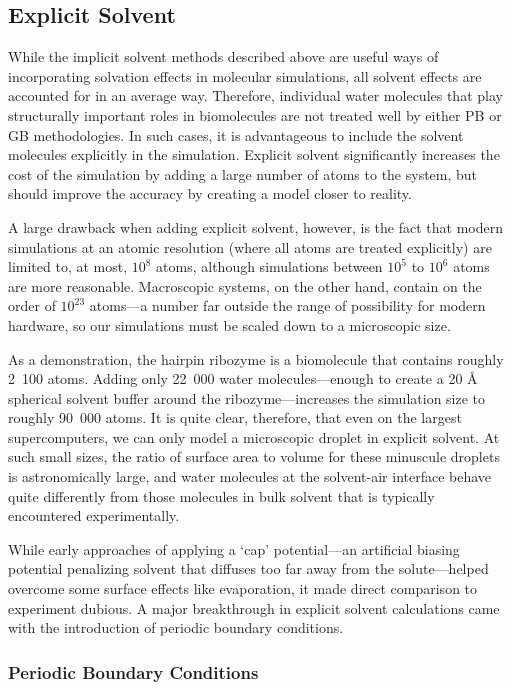 \subsection{Explicit Solvent}

While the implicit solvent methods described above are useful ways of
incorporating solvation effects in molecular simulations, all solvent effects
are accounted for in an average way. Therefore, individual water molecules that
play structurally important roles in biomolecules are not treated well by either
PB or GB methodologies. In such cases, it is advantageous to include the solvent
molecules explicitly in the simulation. Explicit solvent significantly increases
the cost of the simulation by adding a large number of atoms to the system, but
should improve the accuracy by creating a model closer to reality.

A large drawback when adding explicit solvent, however, is the fact that modern
simulations at an atomic resolution (\ie where all atoms are treated explicitly)
are limited to, at most, $10^8$ atoms, \cite{100M_Stupid} although simulations
between $10^5$ to $10^6$ atoms are more reasonable. Macroscopic systems, on the
other hand, contain on the order of $10^{23}$ atoms---a number far outside the
range of possibility for modern hardware, so our simulations must be scaled down
to a microscopic size.

As a demonstration, the hairpin ribozyme is a biomolecule that contains roughly
\mbox{2 100} atoms. Adding only \mbox{22 000} water molecules---enough to create
a 20 {\AA} spherical solvent buffer around the ribozyme---increases the
simulation size to roughly \mbox{90 000} atoms. It is quite clear, therefore,
that even on the largest supercomputers, we can only model a microscopic droplet
in explicit solvent. At such small sizes, the ratio of surface area to volume
for these minuscule droplets is astronomically large, and water molecules at the
solvent-air interface behave quite differently from those molecules in bulk
solvent that is typically encountered experimentally.

While early approaches of applying a `cap' potential---an artificial biasing
potential penalizing solvent that diffuses too far away from the solute---helped
overcome some surface effects like evaporation, it made direct comparison to
experiment dubious. A major breakthrough in explicit solvent calculations came
with the introduction of periodic boundary conditions. \cite{Allen_Tildesley}

\subsubsection{Periodic Boundary Conditions}

